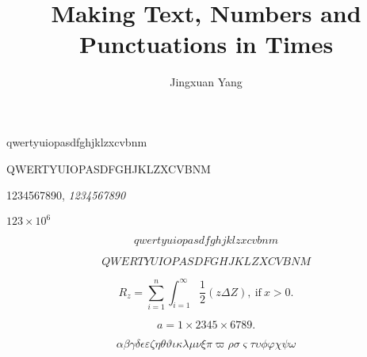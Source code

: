 \documentclass{article}
\title{Making Text, Numbers and Punctuations in Times}
\author{Jingxuan Yang}
\begin{document}
\maketitle

qwertyuiopasdfghjklzxcvbnm

QWERTYUIOPASDFGHJKLZXCVBNM

1234567890, \textit{1234567890}

$123\times10^6$

\begin{equation}
  qwertyuiopasdfghjklzxcvbnm
\end{equation}

\begin{equation}
  QWERTYUIOPASDFGHJKLZXCVBNM
\end{equation}

\begin{equation} 
  R_{z} =\sum_{i=1}^n\int_{i=1}^\infty \frac12 (z \Delta Z),~\text{if}~x>0.
\end{equation}

\begin{equation}
  a=1\times2345\times6789.
\end{equation}

\begin{equation}
  \alpha\beta\gamma\delta\epsilon\varepsilon
  \zeta\eta\theta\vartheta\iota\kappa\lambda\mu\nu\xi\pi\varpi
  \rho\sigma\varsigma\tau\upsilon\phi\varphi\chi\psi\omega
\end{equation}
\end{document}
